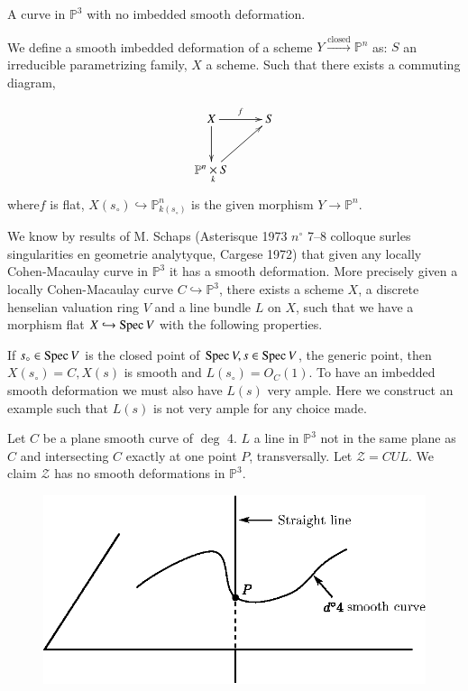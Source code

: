 \begin{example*}
A curve in $\mathbb{P}^3$ with no imbedded smooth deformation.

 We define a smooth imbedded
deformation of a scheme $Y\xrightarrow{\text{closed}}\mathbb{P}^n$ as:
$S$ an irreducible parametrizing family, $X$ a scheme. Such that there
exists a commuting diagram,

\[
\xymatrix{
X \ar[r]^f \ar[d] & S\\
\mathbb{P}^n\underset{k}{\times} S \ar[ur]  
}
\]
where\pageoriginale $f$ is flat,
$X(s_\circ)\hookrightarrow\mathbb{P}_{k(s_\circ)}^n$ is the given
morphism $Y\longrightarrow\mathbb{P}^n$.

We know by results of M. Schaps (Asterisque 1973 $n^\circ$
7--8 colloque surles singularities en geometrie analytyque, Cargese
1972) that given any locally Cohen-Macaulay curve in $\mathbb{P}^3$ it
has a smooth deformation. More precisely given a 
locally Cohen-Macaulay curve $C\hookrightarrow\mathbb{P}^3$, there
exists a scheme $X$, a discrete henselian valuation ring $V$ and a
line bundle $L$ on $X$, such that we have a morphism flat
$X\hookrightarrow \operatorname{Spec} V$ with the following properties. 

If $s_\circ\in\operatorname{Spec} V$ is the closed point of $\operatorname{Spec} V, s\in\operatorname{Spec} V$,
the generic point, then $X(s_\circ)=C, X(s)$ is smooth and
$L(s_\circ)=O_C(1)$. To have an imbedded smooth deformation we must
also have $L(s)$ very ample. Here we construct an example such that
$L(s)$ is not very ample for any choice made.

Let $C$ be a plane smooth curve of $\deg$ 4. $L$ a line in
$\mathbb{P}^3$ not in the same plane as $C$ and intersecting $C$
exactly at one point $P$, transversally. Let $\mathcal{Z}=CUL$. We
claim $\mathcal{Z}$ has no smooth deformations in $\mathbb{P}^3$.
\begin{figure}[H]
\centering
\includegraphics{figure/addfig2.eps}
\end{figure}



\end{example*}

